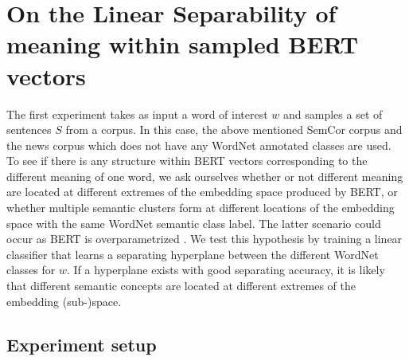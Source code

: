 \documentclass[a4paper,12pt,oneside,openright]{report}
\begin{document}
\section{On the Linear Separability of meaning within sampled BERT vectors}\label{sec:linear_separability_experiment}

The first experiment takes as input a word of interest $w$ and samples a set of sentences $S$ from a corpus.
In this case, the above mentioned SemCor corpus and the news corpus \cite{news_corpus} which does not have any WordNet annotated classes are used.
To see if there is any structure within BERT vectors corresponding to the different meaning of one word, we ask ourselves whether or not different meaning are located at different extremes of the embedding space produced by BERT, or whether multiple semantic clusters form at different locations of the embedding space with the same WordNet semantic class label.
The latter scenario could occur as BERT is overparametrized \cite{kovaleva19}.
We test this hypothesis by training a linear classifier that learns a separating hyperplane between the different WordNet classes for $w$.
If a hyperplane exists with good separating accuracy, it is likely that different semantic concepts are located at different extremes of the embedding (sub-)space.

\subsection{Experiment setup}
\end{document}
